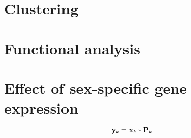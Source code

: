 \section{Clustering}

\section{Functional analysis}

\section{Effect of sex-specific gene expression}



\begin{equation}
{\bf y}_k = {\bf x}_k * {\bf P}_k
\end{equation}

























